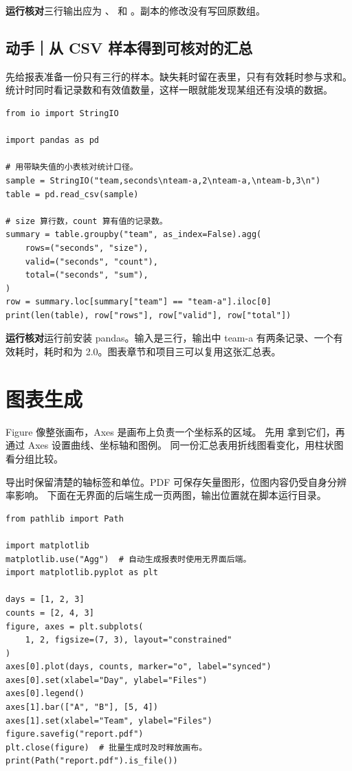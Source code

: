 \textbf{运行核对}\enspace 三行输出应为 、
\code{[4, 6]} 和 。副本的修改没有写回原数组。

\subsection*{动手｜从 CSV 样本得到可核对的汇总}

先给报表准备一份只有三行的样本。缺失耗时留在表里，只有有效耗时参与求和。统计时同时看记录数和有效值数量，这样一眼就能发现某组还有没填的数据。

\begin{lstlisting}[title={\code{sync_summary.py}}]
from io import StringIO

import pandas as pd

# 用带缺失值的小表核对统计口径。
sample = StringIO("team,seconds\nteam-a,2\nteam-a,\nteam-b,3\n")
table = pd.read_csv(sample)

# size 算行数，count 算有值的记录数。
summary = table.groupby("team", as_index=False).agg(
    rows=("seconds", "size"),
    valid=("seconds", "count"),
    total=("seconds", "sum"),
)
row = summary.loc[summary["team"] == "team-a"].iloc[0]
print(len(table), row["rows"], row["valid"], row["total"])
\end{lstlisting}

\textbf{运行核对}\enspace 运行前安装 pandas。输入是三行，输出中 team-a 有两条记录、一个有效耗时，耗时和为 2.0。图表章节和项目三可以复用这张汇总表。

\section{图表生成}

Figure 像整张画布，Axes 是画布上负责一个坐标系的区域。
先用  拿到它们，再通过 Axes 设置曲线、坐标轴和图例。
同一份汇总表用折线图看变化，用柱状图看分组比较。

导出时保留清楚的轴标签和单位。PDF 可保存矢量图形，位图内容仍受自身分辨率影响。
下面在无界面的后端生成一页两图，输出位置就在脚本运行目录。


\begin{lstlisting}[title={\code{draw_report.py}}]
from pathlib import Path

import matplotlib
matplotlib.use("Agg")  # 自动生成报表时使用无界面后端。
import matplotlib.pyplot as plt

days = [1, 2, 3]
counts = [2, 4, 3]
figure, axes = plt.subplots(
    1, 2, figsize=(7, 3), layout="constrained"
)
axes[0].plot(days, counts, marker="o", label="synced")
axes[0].set(xlabel="Day", ylabel="Files")
axes[0].legend()
axes[1].bar(["A", "B"], [5, 4])
axes[1].set(xlabel="Team", ylabel="Files")
figure.savefig("report.pdf")
plt.close(figure)  # 批量生成时及时释放画布。
print(Path("report.pdf").is_file())
\end{lstlisting}


